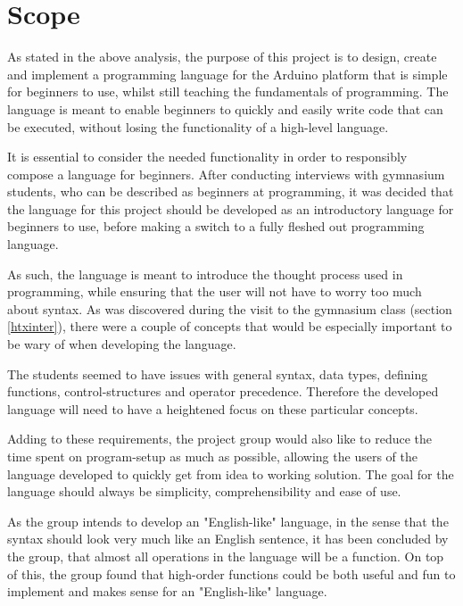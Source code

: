 \section{Scope}
As stated in the above analysis, the purpose of this project is to design, create and implement a programming language for the Arduino platform that is simple for beginners to use, whilst still teaching the fundamentals of programming.
The language is meant to enable beginners to quickly and easily write
code that can be executed, without losing the functionality of a high-level language.

It is essential to consider the needed functionality in order to responsibly compose a language for beginners.
After conducting interviews with gymnasium students, who can be described as beginners at programming, it was decided that the language for this project should be developed as an introductory language for beginners to use, before making a switch to a fully fleshed out programming language.

As such, the language is meant to introduce the thought process used in programming, while ensuring that the user will not have to worry too much about syntax.
As was discovered during the visit to the gymnasium class (section \ref{htxinter}), there were a couple of concepts that would be especially important to be wary of when developing the language.

The students seemed to have issues with general syntax, data types, defining functions, control-structures and operator precedence.
Therefore the developed language will need to have a heightened focus on these particular concepts. 

Adding to these requirements, the project group would also like to reduce the time spent on program-setup as much as possible, allowing the users of the language developed to quickly get from idea to working solution.
The goal for the language should always be simplicity, comprehensibility and ease of use.

As the group intends to develop an "English-like" language, in the sense that the syntax should look very much like an English sentence, it has been concluded by the group, that almost all operations in the language will be a function. 
On top of this, the group found that high-order functions could be both useful and fun to implement and makes sense for an "English-like" language. 

